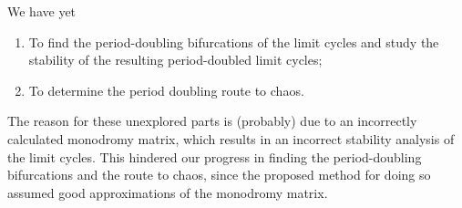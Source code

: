 We have yet
\begin{enumerate}
    \item To find the period-doubling bifurcations of the limit cycles and study the stability of the resulting
    period-doubled limit cycles;
    \item To determine the period doubling route to chaos.
\end{enumerate}

The reason for these unexplored parts is (probably) due to an incorrectly calculated monodromy matrix,
which results in an incorrect stability analysis of the limit cycles. This hindered our progress
in finding the period-doubling bifurcations and the route to chaos, since the proposed method
for doing so assumed good approximations of the monodromy matrix.